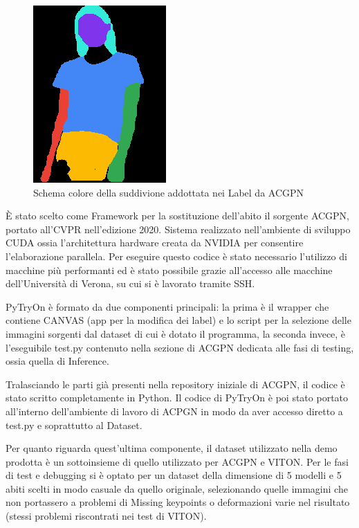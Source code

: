 \documentclass[final, 11pt]{article}
\begin{document}
	\begin{figure}[!htb]
		\begin{center}
			\includegraphics[scale=.7]{002474_0.png}
		\end{center} \caption{Schema colore della suddivione addottata nei Label da ACGPN}
	\end{figure} 
	
	È stato scelto come Framework per la sostituzione dell’abito il sorgente ACGPN, portato all’CVPR nell’edizione 2020. 
	Sistema realizzato nell’ambiente di sviluppo CUDA ossia l'architettura hardware creata da NVIDIA per consentire l’elaborazione parallela. Per eseguire questo codice è stato necessario l’utilizzo di macchine più performanti ed è stato possibile grazie all’accesso alle macchine dell’Università di Verona, su cui si è lavorato tramite SSH.
	
	
	PyTryOn è formato da due componenti principali: la prima è il wrapper che contiene CANVAS (app per la modifica dei label) e lo script per la selezione delle immagini sorgenti dal dataset di cui è dotato il programma, la seconda invece, è l’eseguibile test.py contenuto nella sezione di ACGPN dedicata alle fasi di testing, ossia quella di Inference.
	
	Tralasciando le parti già presenti nella repository iniziale di ACGPN, il codice è stato scritto completamente in Python. Il codice di PyTryOn è poi stato portato all’interno dell’ambiente di lavoro di ACPGN in modo da aver accesso diretto a test.py e soprattutto al Dataset.
	
	Per quanto riguarda quest’ultima componente, il dataset utilizzato nella demo prodotta è un sottoinsieme di quello utilizzato per ACGPN e VITON. Per le fasi di test e debugging si è optato per un dataset della dimensione di 5 modelli e 5 abiti scelti in modo casuale da quello originale, selezionando quelle immagini che non portassero a problemi di Missing keypoints o deformazioni varie nel risultato (stessi problemi riscontrati nei test di VITON).
	
\end{document}

